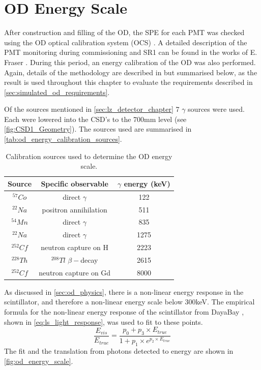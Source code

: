 \section{OD Energy Scale} \label{sec:od_energy_scale}
\par
After construction and filling of the OD, the SPE for each PMT was checked using the OD optical calibration system (OCS) \cite{lz_ocs_system_ref}.
A detailed description of the PMT monitoring during commissioning and SR1 can be found in the works of E. Fraser \cite{ewanfraser_thesis_ref}. 
During this period, an energy calibration of the OD was also performed.
Again, details of the methodology are described in \cite{ewanfraser_thesis_ref} but summarised below, as the result is used throughout this chapter to evaluate the requirements described in \autoref{sec:simulated_od_requirements}.
\par
Of the sources mentioned in \autoref{sec:lz_detector_chapter} 7 $\gamma$ sources were used.
Each were lowered into the CSD's to the 700mm level (see \autoref{fig:CSD1_Geometry}).
The sources used are summarised in \autoref{tab:od_energy_calibration_sources}.

\begin{table}[!htbp]%
    \centering
    \begin{tabular}{c|c|c}
        Source      & Specific observable         &  $\gamma$ energy (keV) \\ \hline
        ${}^{57}Co$ & direct $\gamma$             & 122                        \\
        ${}^{22}Na$ & positron annihilation       & 511               \\
        ${}^{54}Mn$ & direct $\gamma$             & 835                        \\
        ${}^{22}Na$ & direct $\gamma$             & 1275               \\
        ${}^{252}Cf$ & neutron capture on H       & 2223            \\
        ${}^{228}Th$ & ${}^{208}Tl$ $\beta-$decay & 2615            \\
        ${}^{252}Cf$ & neutron capture on Gd      & 8000            
        
    \end{tabular}
    \caption{Calibration sources used to determine the OD energy scale.}
    \label{tab:od_energy_calibration_sources}
\end{table}

\par
As discussed in \autoref{sec:od_physics}, there is a non-linear energy response in the scintillator, and therefore a non-linear energy scale below 300keV.
The empirical formula for the non-linear energy response of the scintillator from DayaBay \cite{dayabay_antineutrino_oscillation_ref, ls_nonlinear_energy_response_ref}, shown in \autoref{eq:ls_light_response}, was used to fit to these points.
\begin{equation}
    \frac{E_{vis}}{E_{true}} = \frac{p_0  + p_3 \times E_{true}}{1 + p_1 \times e^{p_2 \times E_{true}}}
    \label{eq:ls_light_response}
\end{equation}
The fit and the translation from photons detected to energy are shown in \autoref{fig:od_energy_scale}.

